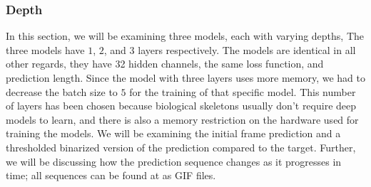 \documentclass[a4paper,12pt]{article}
\begin{document}
\subsubsection{Depth}
In this section, we will be examining three models, each with varying depths, The three models have $1$, $2$, and $3$ layers respectively. The models are identical in all other regards, they have 32 hidden channels, the same loss function, and prediction length. Since the model with three layers uses more memory, we had to decrease the batch size to $5$ for the training of that specific model. This number of layers has been chosen because biological skeletons usually don't require deep models to learn, and there is also a memory restriction on the hardware used for training the models. We will be examining the initial frame prediction and a thresholded binarized version of the prediction compared to the target. Further, we will be discussing how the prediction sequence changes as it progresses in time; all sequences can be found at \cite{gagarahn2025bachelor} as GIF files.
\end{document}
